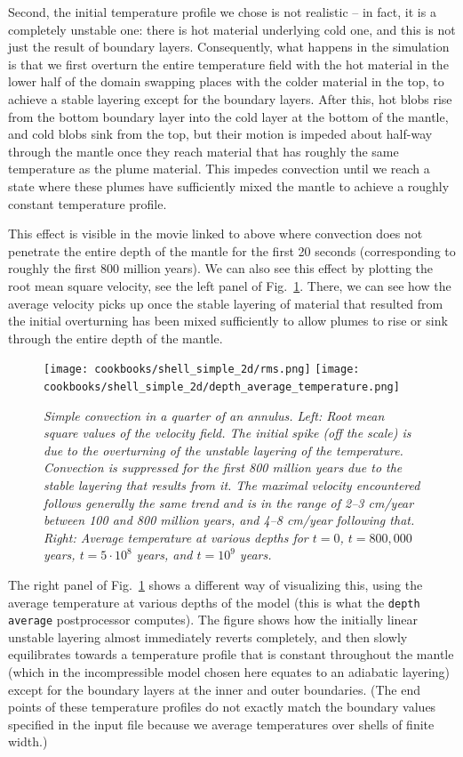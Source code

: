 \documentclass{article}
\begin{document}
Second, the initial temperature profile we chose is not realistic -- in fact, it
is a completely unstable one: there is hot material underlying cold one, and
this is not just the result of boundary layers. Consequently, what happens in
the simulation is that we first overturn the entire temperature field with the
hot material in the lower half of the domain swapping places with the colder
material in the top, to achieve a stable layering except for the boundary
layers. After this, hot blobs rise from the bottom boundary layer into the cold
layer at the bottom of the mantle, and cold blobs sink from the top, but their
motion is impeded about half-way through the mantle once they reach material
that has roughly the same temperature as the plume material. This impedes
convection until we reach a state where these plumes have sufficiently mixed the
mantle to achieve a roughly constant temperature profile.

This effect is visible in the movie linked to above where convection does not
penetrate the entire depth of the mantle for the first 20 seconds
(corresponding to roughly the first 800 million years). We can also see this
effect by plotting the root mean square velocity, see the left panel of
Fig.~\ref{fig:simple-shell-2d-rms}. There, we can see how the average velocity
picks up once the stable layering of material that resulted from the initial
overturning has been mixed sufficiently to allow plumes to rise or sink through
the entire depth of the mantle.

\begin{figure}[tb]
\texttt{[image: cookbooks/shell\_simple\_2d/rms.png]}
\hfill
\texttt{[image: cookbooks/shell\_simple\_2d/depth\_average\_temperature.png]}
\caption{\it Simple convection in a quarter of an annulus. Left: Root mean
square values of the velocity field. The initial spike (off the scale) is due to
the overturning of the unstable layering of the temperature. Convection is suppressed for the
first 800 million years due to the stable layering that results from it. The
maximal velocity encountered follows generally the same trend and is in the
range of 2--3 cm/year between 100 and 800 million years, and 4--8 cm/year
following that. Right: Average temperature at various depths for $t=0$,
$t=800,000$ years, $t=5\cdot 10^8$ years, and $t=10^9$ years.}
\label{fig:simple-shell-2d-rms}
\end{figure}

The right panel of Fig.~\ref{fig:simple-shell-2d-rms} shows a different way of
visualizing this, using the average temperature at various depths of the model
(this is what the \texttt{depth average} postprocessor computes). The figure
shows how the initially linear unstable layering almost immediately reverts
completely, and then slowly equilibrates towards a temperature profile that is
constant throughout the mantle (which in the incompressible model chosen here
equates to an adiabatic layering) except for the boundary layers at the inner
and outer boundaries. (The end points of these temperature profiles do not
exactly match the boundary values specified in the input file because we
average temperatures over shells of finite width.)
\end{document}
